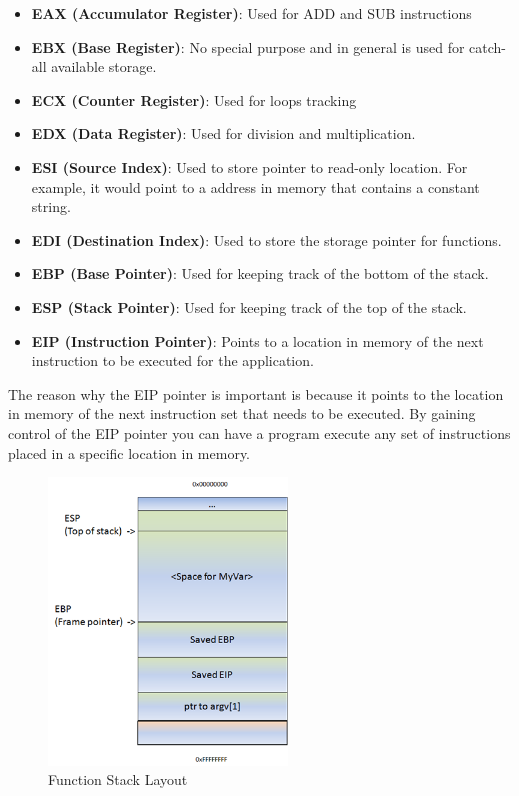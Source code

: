 \documentclass[12pt]{article}
\begin{document}
\begin{itemize}
  \item \textbf{EAX (Accumulator Register)}: Used for ADD and SUB instructions
  \item \textbf{EBX (Base Register)}: No special purpose and in general is 
  used for catch-all available storage. 
  \item \textbf{ECX (Counter Register)}: Used for loops tracking
  \item \textbf{EDX (Data Register)}: Used for division and 
  multiplication.
  \item \textbf{ESI (Source Index)}: Used to store pointer to read-only 
  location. For example, it would point to a address in memory that 
  contains a constant string.
  \item \textbf{EDI (Destination Index)}: Used to store the storage 
  pointer for functions.
  \item \textbf{EBP (Base Pointer)}: Used for keeping track of the bottom 
  of the stack.
  \item \textbf{ESP (Stack Pointer)}: Used for keeping track of the top 
  of the stack.
  \item \textbf{EIP (Instruction Pointer)}: Points to a location in memory 
  of the next instruction to be executed for the application. 
\end{itemize}

The reason why the EIP pointer is important is because it points to the location
in memory of the next instruction set that needs to be executed. By gaining
control of the EIP pointer you can have a program execute any set of
instructions placed in a specific location in memory.

\begin{figure}[ht]
    \centering
    \includegraphics[width=2.5in]{images/function_stack.png}
    \caption{Function Stack Layout \cite{Czumak2013}}
    \label{fig:fnstack}
\end{figure}
\end{document}
